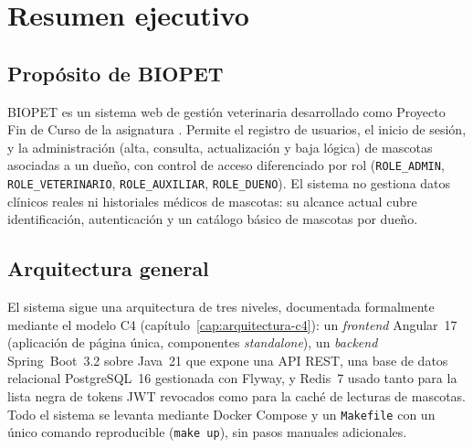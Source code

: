 \chapter{Resumen ejecutivo}
\label{cap:resumen-ejecutivo}

\section*{Prop\'osito de BIOPET}
BIOPET es un sistema web de gesti\'on veterinaria desarrollado como Proyecto
Fin de Curso de la asignatura \asignatura. Permite el registro de usuarios,
el inicio de sesi\'on, y la administraci\'on (alta, consulta, actualizaci\'on
y baja l\'ogica) de mascotas asociadas a un due\~no, con control de acceso
diferenciado por rol (\texttt{ROLE_ADMIN}, \texttt{ROLE_VETERINARIO},
\texttt{ROLE_AUXILIAR}, \texttt{ROLE_DUENO}). El sistema no gestiona datos
cl\'inicos reales ni historiales m\'edicos de mascotas: su alcance actual
cubre identificaci\'on, autenticaci\'on y un cat\'alogo b\'asico de mascotas
por due\~no.

\section*{Arquitectura general}
El sistema sigue una arquitectura de tres niveles, documentada formalmente
mediante el modelo C4 (cap\'itulo~\ref{cap:arquitectura-c4}): un
\emph{frontend} Angular~17 (aplicaci\'on de p\'agina \'unica, componentes
\emph{standalone}), un \emph{backend} Spring~Boot~3.2 sobre Java~21 que
expone una API REST, una base de datos relacional PostgreSQL~16 gestionada
con Flyway, y Redis~7 usado tanto para la lista negra de tokens JWT
revocados como para la cach\'e de lecturas de mascotas. Todo el sistema se
levanta mediante Docker Compose y un \texttt{Makefile} con un \'unico
comando reproducible (\texttt{make up}), sin pasos manuales adicionales.


